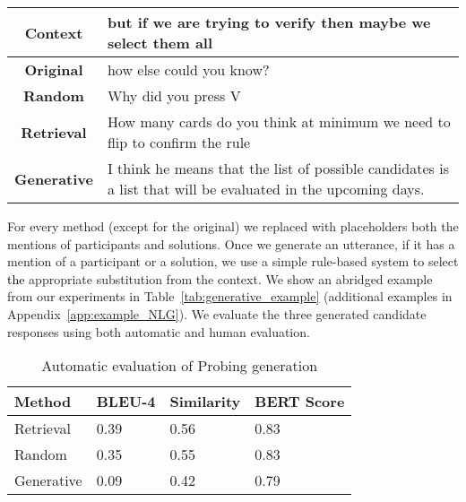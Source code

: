 \documentclass[acmsmall,manuscript,screen]{acmart}
\newcommand\newtext[1]{\textcolor{black}{#1}}
\begin{document}
\begin{table*}[t!]
    \centering
    \begin{tabular}{|c|l|}
        \hline
        \textbf{Context} & 
        \multicolumn{1}{p{10cm}|}{but if we are trying to verify then maybe we select them all} \\ \hline
         \textbf{Original} & how else could you know? \\ \hline
         \textbf{Random} & Why did you press V \\ \hline
         \textbf{Retrieval} & \multicolumn{1}{p{10cm}|}{How many cards do you think at minimum we need to flip to confirm the rule} \\ \hline
         \textbf{Generative} & \multicolumn{1}{p{10cm}|}{I think he means that the list of possible candidates is a list that will be evaluated in the upcoming days.} \\ \hline
    \end{tabular}
    \caption{Utterances generated by different methods}
    \label{tab:generative_example}
\end{table*}


For every method (except for the original) we replaced with placeholders both the mentions of participants and solutions.
Once we generate an utterance, if it has a mention of a participant or a solution, we use a simple rule-based system to select \newtext{the} appropriate substitution from the context. We show an abridged example from our  experiments in Table~\ref{tab:generative_example} (additional examples in Appendix~\ref{app:example_NLG}). 
We evaluate the three generated candidate responses using both automatic and human evaluation.  


\begin{table}[t!]
\centering
    \begin{tabular}{|l|l|l|l|}
    \hline 
    \textbf{Method} & \textbf{BLEU-4} & \textbf{Similarity} &
    \multicolumn{1}{|p{1cm}|}{\centering \textbf{BERT Score}}\\
\hline 
    Retrieval & 0.39 & 0.56 & 0.83  \\ \hline 
    Random & 0.35 & 0.55 & 0.83  \\ \hline 
    Generative & 0.09 & 0.42 & 0.79  \\ \hline 
\end{tabular}
\caption{Automatic evaluation of Probing generation }
\label{table:nlg_auto}
\end{table}
\end{document}
